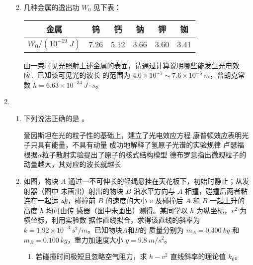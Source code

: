 \begin{enumerate}
\begin{enumerate}

\item 
几种金属的逸出功 $ W_{0} $ 见下表：

\begin{table}[h!]
 \centering 
 \begin{tabular}{|c|c|c|c|c|c|}
 \hline 
金属 & 钨 & 钙 & 钠 & 钾 & 铷
 \\
\hline
$ W_{0}/(10^{-19} \ J) $ & 7.26 & 5.12 & 3.66 & 3.60 & 3.41\\ 
 \hline 
 \end{tabular}
 \end{table} 

由一束可见光照射上述金属的表面，请通过计算说明哪些能发生光电效应．已知该可见光的波长
的范围为 $ 4.0 \times 10^{-7} \sim 7.6 \times 10^{-6} \ m $，普朗克常数 $ h=6.63 \times 10^{-34} \ J \cdot s $。

	
	
\end{enumerate}


\item 
{}
\begin{enumerate}
	\item
下列说法正确的是 \underlinegap 。

\fivechoices
{爱因斯坦在光的粒子性的基础上，建立了光电效应方程}
{康普顿效应表明光子只具有能量，不具有动量}
{成功地解释了氢原子光谱的实验规律}
{卢瑟福根据$ \alpha $粒子散射实验提出了原子的核式结构模型}
{德布罗意指出微观粒子的动量越大，其对应的波长就越长}




\item 
如图，物块 $ A $ 通过一不可伸长的轻绳悬挂在天花板下，初始时静止；从发射器（图中
未画出）射出的物块 $ B $ 沿水平方向与 $ A $ 相撞，碰撞后两者粘连在一起运
动，碰撞前 $ B $ 的速度的大小 $ v $ 及碰撞后 $ A $ 和 $ B $ 一起上升的高度 $ h $ 均可由传
感器（图中未画出）测得。某同学以 $ h $ 为纵坐标，$ v^{2} $ 为横坐标，利用实验数
据作直线拟合，求得该直线的斜率为 $ k=1.92  \times 10^{-3} \ s^{2} /m $。已知物块$ A $和$ B $的
质量分别为 $ m_{A} =0.400 \ kg $ 和 $ m_{B} =0.100 \ kg $，重力加速度大小 $ g=9.8 \ m/s^{2} $。
\begin{enumerate}
	\item
若碰撞时间极短且忽略空气阻力，求 $ h- v^{2} $ 直线斜率的理论值 $ k_{0} $。


\end{enumerate}
\end{enumerate}
\end{enumerate}
